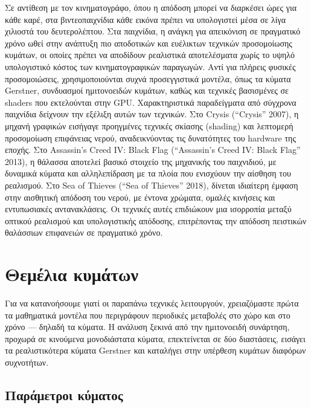 Σε αντίθεση με τον κινηματογράφο, όπου η απόδοση μπορεί να διαρκέσει
ώρες για κάθε καρέ, στα βιντεοπαιχνίδια κάθε εικόνα πρέπει να
υπολογιστεί μέσα σε λίγα χιλιοστά του δευτερολέπτου. Στα παιχνίδια, η
ανάγκη για απεικόνιση σε πραγματικό χρόνο ωθεί στην ανάπτυξη πιο
αποδοτικών και ευέλικτων τεχνικών προσομοίωσης κυμάτων, οι οποίες πρέπει
να αποδίδουν ρεαλιστικά αποτελέσματα χωρίς το υψηλό υπολογιστικό κόστος
των κινηματογραφικών παραγωγών. Αντί για πλήρεις φυσικές προσομοιώσεις,
χρησιμοποιούνται συχνά προσεγγιστικά μοντέλα, όπως τα κύματα Gerstner,
συνδυασμοί ημιτονοειδών κυμάτων, καθώς και τεχνικές βασισμένες σε
shaders που εκτελούνται στην GPU. Χαρακτηριστικά παραδείγματα από
σύγχρονα παιχνίδια δείχνουν την εξέλιξη αυτών των τεχνικών. Στο Crysis
({``Crysis''} 2007), η μηχανή γραφικών εισήγαγε προηγμένες τεχνικές
σκίασης (shading) και λεπτομερή προσομοίωση επιφάνειας νερού,
αναδεικνύοντας τις δυνατότητες του hardware της εποχής. Στο Assassin's
Creed IV: Black Flag ({``Assassin's Creed IV: Black Flag''} 2013), η
θάλασσα αποτελεί βασικό στοιχείο της μηχανικής του παιχνιδιού, με
δυναμικά κύματα και αλληλεπίδραση με τα πλοία που ενισχύουν την αίσθηση
του ρεαλισμού. Στο Sea of Thieves ({``Sea of Thieves''} 2018), δίνεται
ιδιαίτερη έμφαση στην αισθητική απόδοση του νερού, με έντονα χρώματα,
ομαλές κινήσεις και εντυπωσιακές αντανακλάσεις. Οι τεχνικές αυτές
επιδιώκουν μια ισορροπία μεταξύ οπτικού ρεαλισμού και υπολογιστικής
απόδοσης, επιτρέποντας την απόδοση πειστικών θαλάσσιων επιφανειών σε
πραγματικό χρόνο.

\section{Θεμέλια
κυμάτων}\label{ux3b8ux3b5ux3bcux3adux3bbux3b9ux3b1-ux3baux3c5ux3bcux3acux3c4ux3c9ux3bd}

Για να κατανοήσουμε γιατί οι παραπάνω τεχνικές λειτουργούν, χρειαζόμαστε
πρώτα τα μαθηματικά μοντέλα που περιγράφουν περιοδικές μεταβολές στο
χώρο και στο χρόνο --- δηλαδή τα κύματα. Η ανάλυση ξεκινά από την
ημιτονοειδή συνάρτηση, προχωρά σε κινούμενα μονοδιάστατα κύματα,
επεκτείνεται σε δύο διαστάσεις, εισάγει τα ρεαλιστικότερα κύματα
Gerstner και καταλήγει στην υπέρθεση κυμάτων διαφόρων συχνοτήτων.

\subsection{Παράμετροι
κύματος}\label{ux3c0ux3b1ux3c1ux3acux3bcux3b5ux3c4ux3c1ux3bfux3b9-ux3baux3cdux3bcux3b1ux3c4ux3bfux3c2}

